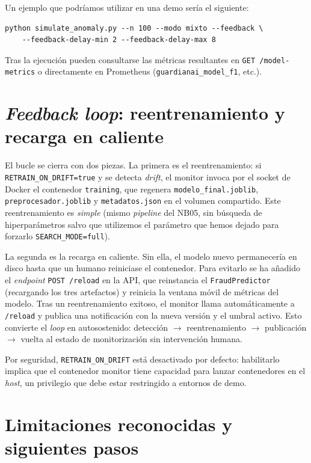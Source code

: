 \documentclass[12pt,a4paper]{report}
\begin{document}
Un ejemplo que podríamos utilizar en una demo sería el siguiente:

\begin{verbatim}
python simulate_anomaly.py --n 100 --modo mixto --feedback \
    --feedback-delay-min 2 --feedback-delay-max 8
\end{verbatim}

Tras la ejecución pueden consultarse las métricas resultantes en \texttt{GET /model-metrics} o directamente en Prometheus (\texttt{guardianai\_model\_f1}, etc.).

\section{\textit{Feedback loop}: reentrenamiento y recarga en caliente}
\label{sec:hito5-loop}

El bucle se cierra con dos piezas. La primera es el reentrenamiento: si \texttt{RETRAIN\_ON\_DRIFT=true} y se detecta \textit{drift}, el monitor invoca por el socket de Docker el contenedor \texttt{training}, que regenera \texttt{modelo\_final.joblib}, \texttt{preprocesador.joblib} y \texttt{metadatos.json} en el volumen compartido. Este reentrenamiento es \textit{simple} (mismo \textit{pipeline} del NB05, sin búsqueda de hiperparámetros salvo que utilizemos el parámetro que hemos dejado para forzarlo \texttt{SEARCH\_MODE=full}).

La segunda es la recarga en caliente. Sin ella, el modelo nuevo permanecería en disco hasta que un humano reiniciase el contenedor. Para evitarlo se ha añadido el \textit{endpoint} \texttt{POST /reload} en la API, que reinstancia el \texttt{FraudPredictor} (recargando los tres artefactos) y reinicia la ventana móvil de métricas del modelo. Tras un reentrenamiento exitoso, el monitor llama automáticamente a \texttt{/reload} y publica una notificación con la nueva versión y el umbral activo. Esto convierte el \textit{loop} en autosostenido: detección $\rightarrow$ reentrenamiento $\rightarrow$ publicación $\rightarrow$ vuelta al estado de monitorización sin intervención humana.

Por seguridad, \texttt{RETRAIN\_ON\_DRIFT} está desactivado por defecto: habilitarlo implica que el contenedor monitor tiene capacidad para lanzar contenedores en el \textit{host}, un privilegio que debe estar restringido a entornos de demo.

\section{Limitaciones reconocidas y siguientes pasos}
\label{sec:hito5-limitaciones}
\end{document}
